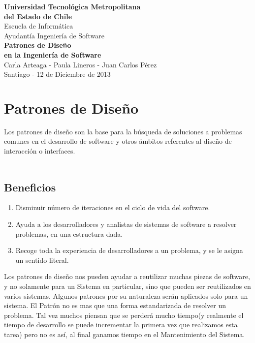 \documentclass[10pt,a4paper]{report}
\begin{document}
\begin{center}
\textbf{{\LARGE Universidad Tecnol\'{o}gica Metropolitana}\\[0.5cm]
{\LARGE del Estado de Chile}}\\[2cm]
{\Large Escuela de Inform\'{a}tica}\\[3cm]
Ayudant\'{i}a Ingenier\'{i}a de Software\\[1cm]
{\Huge \textbf{Patrones de Dise\~no}}\\[0.9cm]
{\Huge \textbf{en la Ingenier\'{i}a de Software}}\\[5cm]
{\large Carla Arteaga - Paula Lineros - Juan Carlos P\'{e}rez}\\[2cm]
Santiago - 12 de Diciembre de 2013
\end{center}
\newpage

\section{Patrones de Dise\~{n}o}

Los patrones de dise\~{n}o son la base para la b\'{u}squeda de soluciones a problemas comunes en el desarrollo de software y otros \'{a}mbitos referentes al dise\~{n}o de interacci\'{o}n o interfaces.\\\

\subsection{Beneficios}
\bigskip
\begin{enumerate}

\item Disminuir n\'{u}mero de iteraciones en el ciclo de vida del software.
\item Ayuda a los desarrolladores y analistas de sistemas de software a 
resolver problemas, en una estructura dada.
\item Recoge toda la experiencia de desarrolladores a un problema, y 
se le asigna un sentido literal.\\

\end{enumerate}


Los patrones de dise\~{n}o nos pueden ayudar a reutilizar muchas piezas de software, y no solamente para un Sistema en particular, sino que pueden ser reutilizados en varios sistemas. Algunos patrones por su naturaleza ser\'{a}n aplicados solo para un sistema. El Patr\'{o}n no es mas que una forma estandarizada de resolver un problema. Tal vez muchos piensan que se perder\'{a} mucho tiempo(y realmente el tiempo de desarrollo se puede incrementar la primera vez que realizamos esta tarea) pero no es as\'{i}, al final ganamos tiempo en el Mantenimiento del Sistema.\\
\end{document}

